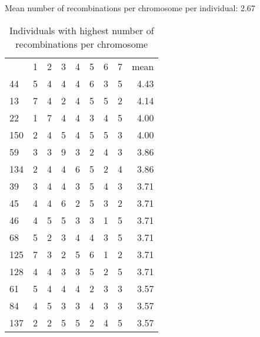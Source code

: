 \documentclass[a4paper,11pt]{article}\usepackage[]{graphicx}\usepackage[]{color}
\begin{document}
Mean number of recombinations per chromosome per individual: 2.67%
\begin{table}[ht]
\begin{flushleft}
\caption{Individuals with highest number of
                     recombinations per chromosome} 
\label{recInd}
\begin{tabular}{lrrrrrrrr}
  & 1 & 2 & 3 & 4 & 5 & 6 & 7 & mean \\ 
 44 & 5 & 4 & 4 & 4 & 6 & 3 & 5 & 4.43 \\ 
  13 & 7 & 4 & 2 & 4 & 5 & 5 & 2 & 4.14 \\ 
  22 & 1 & 7 & 4 & 4 & 3 & 4 & 5 & 4.00 \\ 
  150 & 2 & 4 & 5 & 4 & 5 & 5 & 3 & 4.00 \\ 
  59 & 3 & 3 & 9 & 3 & 2 & 4 & 3 & 3.86 \\ 
  134 & 2 & 4 & 4 & 6 & 5 & 2 & 4 & 3.86 \\ 
  39 & 3 & 4 & 4 & 3 & 5 & 4 & 3 & 3.71 \\ 
  45 & 4 & 4 & 6 & 2 & 5 & 3 & 2 & 3.71 \\ 
  46 & 4 & 5 & 5 & 3 & 3 & 1 & 5 & 3.71 \\ 
  68 & 5 & 2 & 3 & 4 & 4 & 3 & 5 & 3.71 \\ 
  125 & 7 & 3 & 2 & 5 & 6 & 1 & 2 & 3.71 \\ 
  128 & 4 & 4 & 3 & 3 & 5 & 2 & 5 & 3.71 \\ 
  61 & 5 & 4 & 4 & 4 & 2 & 3 & 3 & 3.57 \\ 
  84 & 4 & 5 & 3 & 3 & 4 & 3 & 3 & 3.57 \\ 
  137 & 2 & 2 & 5 & 5 & 2 & 4 & 5 & 3.57 \\ 
  \end{tabular}
\end{flushleft}
\end{table}

\end{document}
